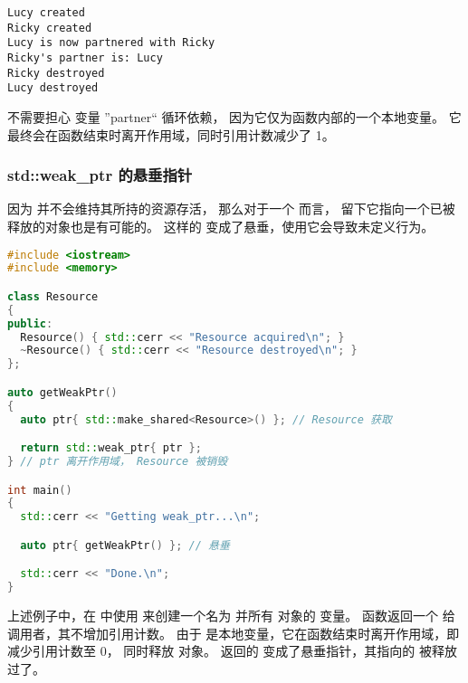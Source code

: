 \documentclass[../../LearnCpp.tex]{subfiles}
\begin{document}
\begin{lstlisting}
Lucy created
Ricky created
Lucy is now partnered with Ricky
Ricky's partner is: Lucy
Ricky destroyed
Lucy destroyed
\end{lstlisting}

不需要担心  变量 ”partner“ 循环依赖，
因为它仅为函数内部的一个本地变量。
它最终会在函数结束时离开作用域，同时引用计数减少了 1。

\subsubsection*{std::weak\_ptr 的悬垂指针}

因为  并不会维持其所持的资源存活，
那么对于一个  而言，
留下它指向一个已被  释放的对象也是有可能的。
这样的  变成了悬垂，使用它会导致未定义行为。

\begin{lstlisting}[language=C++]
#include <iostream>
#include <memory>

class Resource
{
public:
  Resource() { std::cerr << "Resource acquired\n"; }
  ~Resource() { std::cerr << "Resource destroyed\n"; }
};

auto getWeakPtr()
{
  auto ptr{ std::make_shared<Resource>() }; // Resource 获取

  return std::weak_ptr{ ptr };
} // ptr 离开作用域， Resource 被销毁

int main()
{
  std::cerr << "Getting weak_ptr...\n";

  auto ptr{ getWeakPtr() }; // 悬垂

  std::cerr << "Done.\n";
}
\end{lstlisting}

上述例子中，在  中使用 
来创建一个名为  并所有  对象的  变量。
函数返回一个  给调用者，其不增加引用计数。
由于  是本地变量，它在函数结束时离开作用域，即减少引用计数至 0，
同时释放  对象。
返回的  变成了悬垂指针，其指向的  被释放过了。
\end{document}
